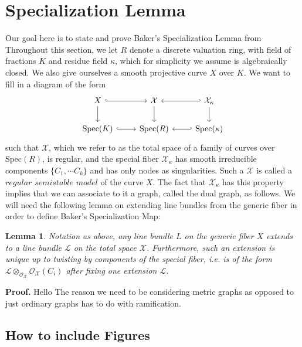 \documentclass{article}
\newtheorem{lemma}[theorem]{Lemma}
\begin{document}
\section{Specialization Lemma}
Our goal here is to state and prove Baker's Specialization Lemma from \cite{baker08} Throughout this section, we let $R$ denote a discrete valuation ring, with field of fractions $K$ and residue field $\kappa$, which for simplicity we assume is algebraically closed. We also give ourselves a smooth projective curve $X$ over $K$. We want to fill in a diagram of the form
\[
\begin{tikzcd}
X \arrow[d] \arrow[r, hook]    & \mathcal{X} \arrow[d] & \mathcal{X}_{\kappa} \arrow[d] \arrow[l, hook'] \\
\text{Spec}(K) \arrow[r, hook] & \text{Spec}(R)        & \text{Spec}(\kappa) \arrow[l, hook']   \end{tikzcd}
\]
such that $\mathcal{X}$, which we refer to as the total space of a family of curves over $\text{Spec}(R)$, is regular, and the special fiber $\mathcal{X}_{\kappa}$ has smooth irreducible components $\{C_1, \cdots C_k\}$ and has only nodes as singularities. Such a $\mathcal{X}$ is called a $\textit{regular semistable model}$ of the curve $X$. The fact that $\mathcal{X}_{\kappa}$ has this property implies that we can associate to it a graph, called the dual graph, as follows. 
\newline
\newline
We will need the following lemma on extending line bundles from the generic fiber in order to define Baker's Specialization Map:
\begin{lemma}
Notation as above, any line bundle $L$ on the generic fiber $X$ extends to a line bundle $\mathcal{L}$ on the total space $\mathcal{X}$. Furthermore, such an extension is unique up to twisting by components of the special fiber, i.e. is of the form $\mathcal{L}\otimes_{\mathcal{O}_{\mathcal{X}}}\mathcal{O}_{\mathcal{X}}(C_i)$ after fixing one extension $\mathcal{L}$.  
\end{lemma}
\textbf{Proof.} Hello
\newline
\newline
The reason we need to be considering metric graphs as opposed to just ordinary graphs has to do with ramification. 

\subsection{How to include Figures}
\end{document}
